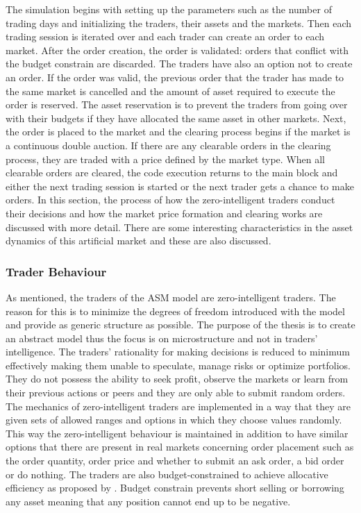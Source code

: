 The simulation begins with setting up the parameters such as the number of
trading days and initializing the traders, their assets and the markets.
Then each trading session is iterated over and each trader can create  
an order to each market. After the order creation, the order is validated: 
orders that conflict with the budget constrain are discarded.
The traders have also an option not to create an order. If the order was
valid, the previous order that the trader has made to the same market is cancelled 
and the amount of asset required to execute the order is reserved. The asset
reservation is to prevent the traders from going over with their budgets if they
have allocated the same asset in other markets. Next, the order is
placed to the market and the clearing process begins if the market is a 
continuous double auction. If there are any clearable orders in the clearing process,
they are traded with a price defined by the market type. When
all clearable orders are cleared, the code execution returns to the
main block and either the next trading session is started or the next
trader gets a chance to make orders. In this section, the process of how the
zero-intelligent traders conduct their decisions and how the 
market price formation and clearing works are discussed with more detail.
There are some interesting characteristics in the asset dynamics of this
artificial market and these are also discussed.

\subsubsection{Trader Behaviour}

As mentioned, the traders of the ASM model are zero-intelligent
traders. The reason for this is to minimize the degrees of freedom introduced with 
the model and provide as generic structure as possible. The purpose of the thesis is to 
create an abstract model thus the focus is on microstructure and not in traders' intelligence. The traders' rationality 
for making decisions is reduced to minimum effectively making them unable to speculate, 
manage risks or optimize portfolios. They do not possess the ability to seek profit, 
observe the markets or learn from their previous actions or peers and
they are only able to submit random orders. The mechanics of zero-intelligent traders
are implemented in a way that they are given sets of allowed ranges 
and options in which they choose values randomly. This way the zero-intelligent behaviour is maintained
in addition to have similar options that there are present in real markets 
concerning order placement such as the order quantity, order price and whether
to submit an ask order, a bid order or do nothing. The traders are also budget-constrained
to achieve allocative efficiency as proposed by
\citet{God93}. Budget constrain prevents short selling or borrowing any asset meaning that 
any position cannot end up to be negative.


